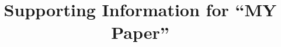 \documentclass[draft,jgrga]{agutexSI2019}
\begin{document}
%
%



\title{Supporting Information for ``MY Paper''}
%
%

%
%












%
%

%
\end{document}
